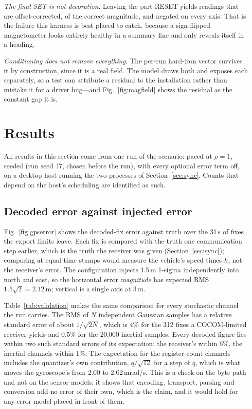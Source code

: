 \documentclass[preprint,12pt,a4paper]{elsarticle}
\begin{document}
\emph{The final SET is not decoration.} Leaving the part RESET yields readings
that are offset-corrected, of the correct magnitude, and negated on every axis.
That is the failure this harness is best placed to catch, because a sign-flipped
magnetometer looks entirely healthy in a summary line and only reveals itself in
a heading.

\emph{Conditioning does not remove everything.} The per-run hard-iron vector
survives it by construction, since it is a real field. The model draws both and
exposes each separately, so a test can attribute a residual to the installation
rather than mistake it for a driver bug---and Fig.~\ref{fig:magfield} shows the
residual as the constant gap it is.

\section{Results}
\label{sec:results}

All results in this section come from one run of the scenario: paced at
$\rho=1$, seeded (run seed 17, chosen before the run), with every optional
error term off, on a desktop host running the two processes of
Section~\ref{sec:sync}. Counts that depend on the host's scheduling are
identified as such.

\subsection{Decoded error against injected error}
Fig.~\ref{fig:gpserror} shows the decoded-fix error against truth over the
31\,s of fixes the export limits leave. Each fix is compared with the truth one
communication step earlier, which is the truth the receiver was given
(Section~\ref{sec:sync}); comparing at equal time stamps would measure the
vehicle's speed times $h$, not the receiver's error. The configuration injects
1.5\,m 1-sigma independently into north and east, so the horizontal error
\emph{magnitude} has expected RMS $1.5\sqrt{2}=2.12$\,m; vertical is a single
axis at 3\,m.

Table~\ref{tab:validation} makes the same comparison for every stochastic
channel the run carries. The RMS of $N$ independent Gaussian samples has a
relative standard error of about $1/\sqrt{2N}$, which is $4\%$ for the 312
fixes a COCOM-limited receiver yields and $0.5\%$ for the 20{,}000 inertial
samples. Every decoded figure lies within two such standard errors of its
expectation: the receiver's within $6\%$, the inertial channels within $1\%$.
The expectation for the register-count channels includes the quantizer's own
contribution, $q/\sqrt{12}$ for a step of $q$, which is what moves the
gyroscope's from 2.00 to 2.02\,mrad/s. This is a check on the byte path and not
on the sensor models: it shows that encoding, transport, parsing and conversion
add no error of their own, which is the claim, and it would hold for any error
model placed in front of them.
\end{document}
